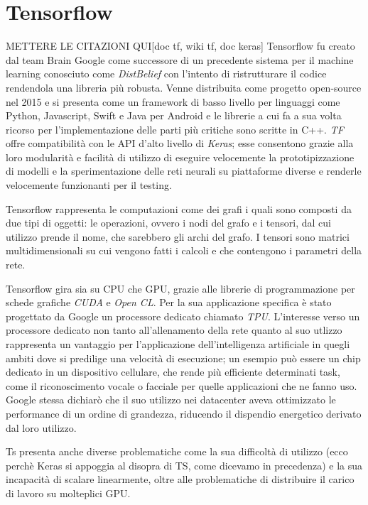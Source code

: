\section{Tensorflow}
METTERE LE CITAZIONI QUI[doc tf, wiki tf, doc keras]
Tensorflow  fu creato dal team Brain Google come successore di un precedente sistema per il machine learning conosciuto come \textit{DistBelief} con l'intento di ristrutturare il codice rendendola una libreria più robusta. Venne distribuita come progetto open-source nel 2015 e si presenta come un framework di basso livello \cite{oreilly:pytorch_intro} per linguaggi come Python, Javascript, Swift e Java per Android  e le librerie a cui fa a sua volta ricorso per l'implementazione delle parti più critiche sono scritte in C++. \textit{TF} offre compatibilità con le API d'alto livello di \textit{Keras}; esse consentono grazie alla loro modularità e facilità di utilizzo di eseguire velocemente la prototipizzazione di modelli e la sperimentazione delle reti neurali su piattaforme diverse e renderle velocemente funzionanti per il testing.

Tensorflow rappresenta le computazioni come dei grafi i quali sono composti da due tipi di oggetti: le operazioni, ovvero i nodi del grafo e i tensori, dal cui utilizzo prende il nome, che sarebbero gli archi del grafo.
I tensori sono matrici multidimensionali su cui vengono fatti i calcoli e che contengono i parametri della rete.

Tensorflow gira sia su CPU che GPU, grazie alle librerie di programmazione per schede grafiche \textit{CUDA} e \textit{Open CL}. Per la sua applicazione specifica è stato progettato da Google un processore dedicato chiamato \textit{TPU}. L'interesse verso un processore dedicato non tanto all'allenamento della rete quanto al suo utlizzo rappresenta un vantaggio per l'applicazione dell'intelligenza artificiale in quegli ambiti dove si predilige una velocità di esecuzione; un esempio può essere un chip dedicato in un dispositivo cellulare, che rende più efficiente determinati task, come il riconoscimento vocale o facciale per quelle applicazioni che ne fanno uso. Google stessa dichiarò che il suo utilizzo nei datacenter aveva ottimizzato le performance di un ordine di grandezza, riducendo il dispendio energetico derivato dal loro utilizzo. 

Ts presenta anche diverse problematiche come la sua difficoltà di utilizzo (ecco perchè Keras si appoggia al disopra di TS, come dicevamo in precedenza) e la sua incapacità di scalare linearmente, oltre alle problematiche di distribuire il carico di lavoro su molteplici GPU\cite{quora:mxnet}.

